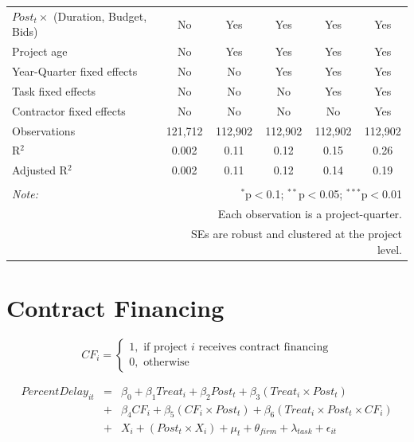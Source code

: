 \documentclass[
]{article}
\begin{document}
\begin{table}[H]
\begin{tabular}{@{\extracolsep{-2pt}}lccccc}
$Post_t \times$  (Duration, Budget, Bids) & No & Yes & Yes & Yes & Yes \\ 
Project age & No & Yes & Yes & Yes & Yes \\ 
Year-Quarter fixed effects & No & No & Yes & Yes & Yes \\ 
Task fixed effects & No & No & No & Yes & Yes \\ 
Contractor fixed effects & No & No & No & No & Yes \\ 
Observations & 121,712 & 112,902 & 112,902 & 112,902 & 112,902 \\ 
R$^{2}$ & 0.002 & 0.11 & 0.12 & 0.15 & 0.26 \\ 
Adjusted R$^{2}$ & 0.002 & 0.11 & 0.12 & 0.14 & 0.19 \\ 
\hline 
\hline \\[-1.8ex] 
\textit{Note:}  & \multicolumn{5}{r}{$^{*}$p$<$0.1; $^{**}$p$<$0.05; $^{***}$p$<$0.01} \\ 
 & \multicolumn{5}{r}{Each observation is a project-quarter.} \\ 
 & \multicolumn{5}{r}{SEs are robust and clustered at the project level.} \\ 
\end{tabular} 
\end{table}

\hypertarget{contract-financing}{%
\section{Contract Financing}\label{contract-financing}}

\[ CF_i = \begin{cases} 1, \text{ if project } i \text{ receives contract financing}\\
0, \text{ otherwise} \end{cases}\]

\[ \begin{aligned}
PercentDelay_{it} &=& \beta_0+\beta_1 Treat_i + \beta_2 Post_t + \beta_3 (Treat_i \times Post_t) \\
&+&\beta_4 CF_i + \beta_5 (CF_i \times Post_t) + \beta_6 (Treat_i \times Post_t \times CF_i) \\ 
&+&X_i + (Post_t \times X_i) + \mu_t + \theta_{firm} + \lambda_{task}+ \epsilon_{it}
\end{aligned}\]
\end{document}
